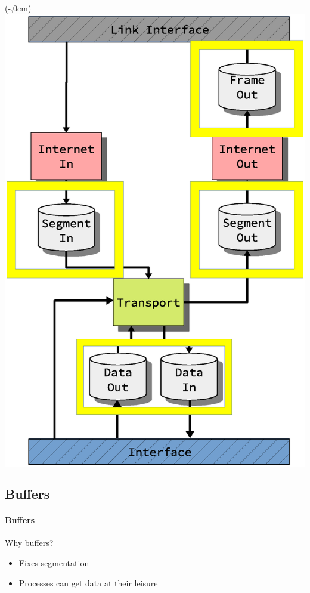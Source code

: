 
\begin{frame}[fragile]
    \begin{textblock*}{\displayThumbnail}(\paperwidth-\displayThumbnail-0.2cm,0cm) %
        \colorbox{white}{\includegraphics[width=\textwidth]{implementation/design_2_memory.eps}}
    \end{textblock*}
    \frametitle{\ImplementationTitle}
    \subsection{Buffers}
    \framesubtitle{Buffers}
    Why buffers?
    \begin{itemize}
        \item Fixes segmentation
        \item Processes can get data at their leisure
    \end{itemize}
\end{frame}



